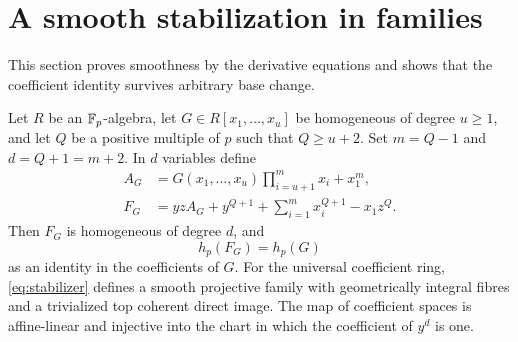 \section{A smooth stabilization in families}
This section proves smoothness by the derivative equations and shows that the coefficient identity survives arbitrary base change.

\begin{theorem}\label{thm:stabilizer}
Let $R$ be an $\mathbb F_p$-algebra, let $G\in R[x_1,\ldots,x_u]$ be homogeneous of degree $u\ge1$, and let $Q$ be a positive multiple of $p$ such that $Q\ge u+2$. Set $m=Q-1$ and $d=Q+1=m+2$. In $d$ variables define
\begin{align}
A_G&=G(x_1,\ldots,x_u)\prod_{i=u+1}^{m}x_i+x_1^m,\label{eq:padding}\\
F_G&=yzA_G+y^{Q+1}+\sum_{i=1}^{m}x_i^{Q+1}-x_1z^Q.\label{eq:stabilizer}
\end{align}
Then $F_G$ is homogeneous of degree $d$, and
\begin{equation}\label{eq:hasse-stabilizer}
h_p(F_G)=h_p(G)
\end{equation}
as an identity in the coefficients of $G$. For the universal coefficient ring, \eqref{eq:stabilizer} defines a smooth projective family with geometrically integral fibres and a trivialized top coherent direct image. The map of coefficient spaces is affine-linear and injective into the chart in which the coefficient of $y^d$ is one.
\end{theorem}

